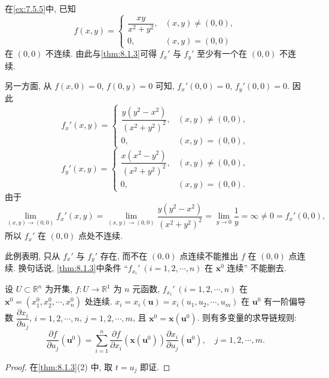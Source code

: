 \begin{example}\label{ex:8.1.11}
在\cref{ex:7.5.5}中, 已知
\[
  f(x, y) = \begin{cases}
    \dfrac{xy}{x^{2} + y^{2}}, & (x, y) \neq (0, 0), \\[2.5mm]
    0, & (x, y) = (0, 0)
  \end{cases}
\]
在 $(0, 0)$ 不连续. 由此与\cref{thm:8.1.3}可得 $f_{x}'$ 与 $f_{y}'$ 至少有一个在 $(0, 0)$ 不连续.

另一方面, 从 $f(x, 0) = 0$, $f(0, y) = 0$ 可知, $f_{x}'(0, 0) = 0$, $f_{y}'(0, 0) = 0$. 因此
\[
  f_{x}'(x, y) = \begin{cases}
    \dfrac{y(y^{2} - x^{2})}{(x^{2} + y^{2})^{2}}, & (x, y) \neq (0, 0), \\[2.5mm]
    0, & (x, y) = (0, 0),
  \end{cases}
\]
\[
  f_{y}'(x, y) = \begin{cases}
    \dfrac{x(x^{2} - y^{2})}{(x^{2} + y^{2})^{2}}, & (x, y) \neq (0, 0), \\[2.5mm]
    0, & (x, y) = (0, 0).
  \end{cases}
\]
由于
\[
  \lim_{(x, y) \to (0, 0)} f_{x}'(x, y) = \lim_{(x, y) \to (0, 0)}\frac{y(y^{2} - x^{2})}{(x^{2} + y^{2})^{2}} = \lim_{y \to 0}\frac{1}{y} = \infty \neq 0 = f_{x}'(0, 0),
\]
所以 $f_{x}'$ 在 $(0, 0)$ 点处不连续.

此例表明, 只从 $f_{x}'$ 与 $f_{y}'$ 存在, 而不在 $(0, 0)$ 点连续不能推出 $f$ 在 $(0, 0)$ 点连续. 换句话说, \cref{thm:8.1.3}中条件 ``$f_{x_{i}}'\ (i = 1, 2, \cdots, n)$ 在 $\boldsymbol{x}^{0}$ 连续'' 不能删去.
\end{example}

\begin{theorem}\label{thm:8.1.4}
设 $U \subset \mathbb{R}^{n}$ 为开集, $f: U \to \mathbb{R}^{1}$ 为 $n$ 元函数, $f_{x_{i}}'\ (i = 1, 2, \cdots, n)$ 在 $\boldsymbol{x}^{0} = (x_{1}^{0}, x_{2}^{0}, \cdots, x_{n}^{0})$ 处连续. $x_{i} = x_{i}(\boldsymbol{u}) = x_{i}(u_{1}, u_{2}, \cdots, u_{m})$ 在 $\boldsymbol{u}^{0}$ 有一阶偏导数 $\dfrac{\partial x_{i}}{\partial u_{j}}$, $i = 1, 2, \cdots, n$, $j = 1, 2, \cdots, m$, 且 $\boldsymbol{x}^{0} = \boldsymbol{x}(\boldsymbol{u}^{0})$. 则有多变量的求导链规则:
\[
  \frac{\partial f}{\partial u_{j}}(\boldsymbol{u}^{0}) = \sum_{i = 1}^{n}\frac{\partial f}{\partial x_{i}}(\boldsymbol{x}(\boldsymbol{u}^{0}))\frac{\partial x_{i}}{\partial u_{j}}(\boldsymbol{u}^{0}), \quad j = 1, 2, \cdots, m.
\]
\end{theorem}

\begin{proof}
在\cref{thm:8.1.3}(2) 中, 取 $t = u_{j}$ 即证.\qedhere
\end{proof}

